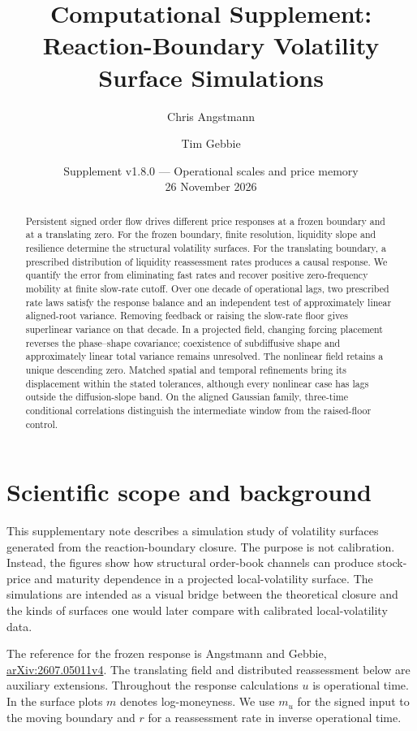 \documentclass[11pt]{article}
\title{Computational Supplement:\\Reaction-Boundary Volatility Surface Simulations}
\author{Chris Angstmann \and Tim Gebbie}
\date{Supplement v1.8.0 --- Operational scales and price memory\\26 November 2026}
\begin{document}
\maketitle

\begin{abstract}
Persistent signed order flow drives different price responses at a frozen boundary and at a translating zero. For the frozen boundary, finite resolution, liquidity slope and resilience determine the structural volatility surfaces. For the translating boundary, a prescribed distribution of liquidity reassessment rates produces a causal response. We quantify the error from eliminating fast rates and recover positive zero-frequency mobility at finite slow-rate cutoff. Over one decade of operational lags, two prescribed rate laws satisfy the response balance and an independent test of approximately linear aligned-root variance. Removing feedback or raising the slow-rate floor gives superlinear variance on that decade. In a projected field, changing forcing placement reverses the phase--shape covariance; coexistence of subdiffusive shape and approximately linear total variance remains unresolved. The nonlinear field retains a unique descending zero. Matched spatial and temporal refinements bring its displacement within the stated tolerances, although every nonlinear case has lags outside the diffusion-slope band. On the aligned Gaussian family, three-time conditional correlations distinguish the intermediate window from the raised-floor control.
\end{abstract}
\tableofcontents

\section{Scientific scope and background}

This supplementary note describes a simulation study of volatility surfaces
generated from the reaction-boundary closure. The purpose is not calibration.
Instead, the figures show how structural order-book channels can produce
stock-price and maturity dependence in a projected local-volatility surface.
The simulations are intended as a visual bridge between the theoretical
closure and the kinds of surfaces one would later compare with calibrated
local-volatility data.

The reference for the frozen response is Angstmann and Gebbie,
\href{https://arxiv.org/abs/2607.05011v4}{arXiv:2607.05011v4}.
The translating field and distributed reassessment below are auxiliary
extensions. Throughout the response calculations \(u\) is operational
time. In the surface plots \(m\) denotes log-moneyness. We use \(m_u\)
for the signed input to the moving boundary and \(r\) for a reassessment
rate in inverse operational time.
\end{document}

